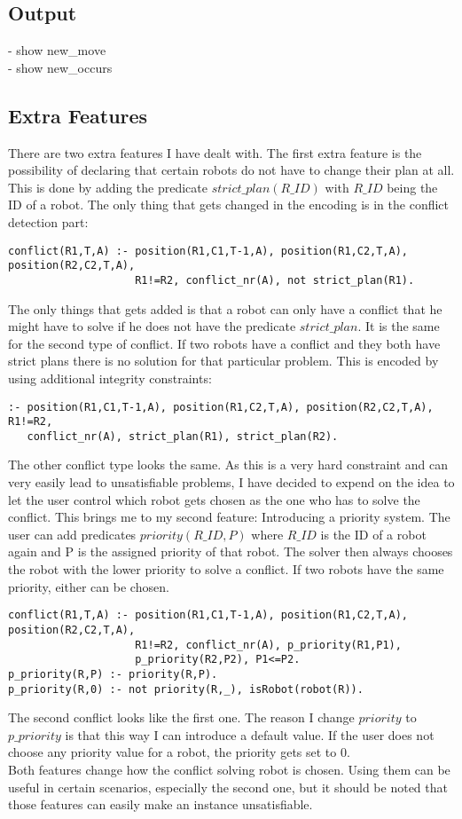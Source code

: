 \documentclass[runningheads]{llncs}
\begin{document}
\subsection{Output}
- show new\_move \\
- show new\_occurs

\subsection{Extra Features}
There are two extra features I have dealt with. The first extra feature is the possibility of declaring that certain robots do not have to change their plan at all.
This is done by adding the predicate $strict\_plan(R\_ID)$ with $R\_ID$ being the ID of a robot. The only thing that gets changed in the encoding is in the conflict detection part:
\begin{verbatim}
conflict(R1,T,A) :- position(R1,C1,T-1,A), position(R1,C2,T,A), position(R2,C2,T,A), 
                    R1!=R2, conflict_nr(A), not strict_plan(R1).
\end{verbatim}
The only things that gets added is that a robot can only have a conflict that he might have to solve if he does not have the predicate $strict\_plan$. It is
the same for the second type of conflict. If two robots have a conflict and they both have strict plans there is no solution for that particular problem. 
This is encoded by using additional integrity constraints:
\begin{verbatim}
:- position(R1,C1,T-1,A), position(R1,C2,T,A), position(R2,C2,T,A), R1!=R2, 
   conflict_nr(A), strict_plan(R1), strict_plan(R2).
\end{verbatim}
The other conflict type looks the same. As this is a very hard constraint and can very easily lead to unsatisfiable problems, I have decided to expend on the idea
to let the user control which robot gets chosen as the one who has to solve the conflict. This brings me to my second feature: Introducing a priority system.
The user can add predicates $priority(R\_ID, P)$ where $R\_ID$ is the ID of a robot again and P is the assigned priority of that robot. 
The solver then always chooses the robot with the lower priority to solve a conflict. If two robots have the same priority, either can be chosen. 
\begin{verbatim}
conflict(R1,T,A) :- position(R1,C1,T-1,A), position(R1,C2,T,A), position(R2,C2,T,A), 
                    R1!=R2, conflict_nr(A), p_priority(R1,P1), 
                    p_priority(R2,P2), P1<=P2.
p_priority(R,P) :- priority(R,P).
p_priority(R,0) :- not priority(R,_), isRobot(robot(R)).						
\end{verbatim}
The second conflict looks like the first one. The reason I change $priority$ to $p\_priority$ is that this way I can introduce a default value. If the user does not choose any priority value for a robot,
the priority gets set to 0. \\
Both features change how the conflict solving robot is chosen. Using them can be useful in certain scenarios, especially the second one, but it should be noted that those features can
easily make an instance unsatisfiable.
\end{document}
